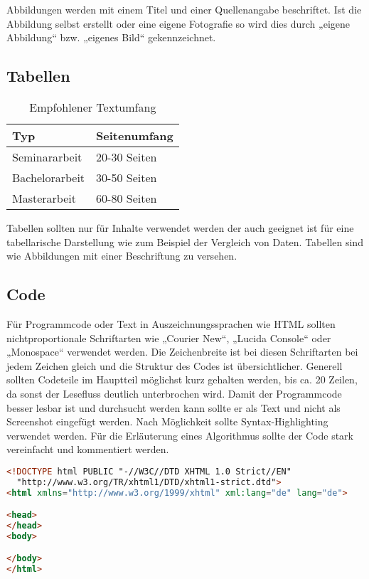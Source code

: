 Abbildungen werden mit einem Titel und einer Quellenangabe beschriftet. Ist die Abbildung selbst erstellt oder eine eigene Fotografie so wird dies durch „eigene Abbildung“ bzw. „eigenes Bild“ gekennzeichnet. 


\subsection{Tabellen}\label{subsubsec:tabellen}

{\renewcommand{\arraystretch}{1.5}
\begin{table}[h!]
\centering
\begin{tabular}{ l|l } 
\hline
\bfseries Typ & \bfseries Seitenumfang\\
\hline
Seminararbeit & 20-30 Seiten \\
Bachelorarbeit & 30-50 Seiten \\
Masterarbeit & 60-80 Seiten \\
\hline
\end{tabular}
\caption{Empfohlener Textumfang}
\label{table:textumfang}
\end{table}}

Tabellen sollten nur für Inhalte verwendet werden der auch geeignet ist für eine tabellarische Darstellung wie zum Beispiel der Vergleich von Daten. Tabellen sind wie Abbildungen mit einer Beschriftung zu versehen.

\subsection{Code}\label{subsubsec:code}

Für Programmcode oder Text in Auszeichnungssprachen wie HTML sollten nichtproportionale Schriftarten wie „Courier New“, „Lucida Console“ oder „Monospace“ verwendet werden. Die Zeichenbreite ist bei diesen Schriftarten bei jedem Zeichen gleich und die Struktur des Codes ist übersichtlicher. Generell sollten Codeteile im Hauptteil möglichst kurz gehalten werden, bis ca. 20 Zeilen, da sonst der Lesefluss deutlich unterbrochen wird.  Damit der Programmcode besser lesbar ist und durchsucht werden kann sollte er als Text und nicht als Screenshot eingefügt werden. Nach Möglichkeit sollte Syntax-Highlighting verwendet werden. Für die  Erläuterung eines Algorithmus sollte der Code stark vereinfacht und kommentiert werden.


\begin{lstlisting}[language=HTML,caption={So sieht Code schön aus.},captionpos=b,label=code:arduino_blink]
<!DOCTYPE html PUBLIC "-//W3C//DTD XHTML 1.0 Strict//EN"
  "http://www.w3.org/TR/xhtml1/DTD/xhtml1-strict.dtd">
<html xmlns="http://www.w3.org/1999/xhtml" xml:lang="de" lang="de">

<head>
</head>
<body>

</body>
</html>
\end{lstlisting}


